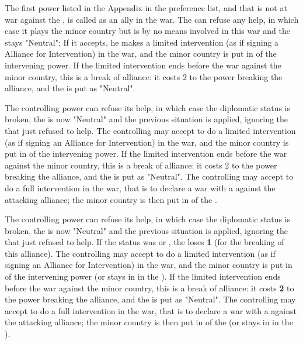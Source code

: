 The first power listed in the Appendix in the preference list, and that is not
at war against the \MIN, is called as an ally in the war.
\bparag The \MAJ can refuse any help, in which case it plays the minor country
but is by no means involved in this war and the \MIN stays "Neutral";
\bparag If it accepts, he makes a limited intervention (as if signing a
Alliance for Intervention) in the war, and the minor country is put in \AM of
the intervening power.
\bparag If the limited intervention ends before the war against the minor
country, this is a break of alliance: it costs 2 \STAB to the power breaking
the alliance, and the \MIN is put as "Neutral".

\bparag The controlling power can refuse its help, in which case the
diplomatic status is broken, the \MIN is now "Neutral" and the previous
situation is applied, ignoring the \MAJ that just refused to help.
\bparag The controlling \MAJ may accept to do a limited intervention (as if
signing an Alliance for Intervention) in the war, and the minor country is put
in \AM of the intervening power.
\bparag If the limited intervention ends before the war against the minor
country, this is a break of alliance: it costs 2 \STAB to the power breaking
the alliance, and the \MIN is put as "Neutral".
\bparag The controlling \MAJ may accept to do a full intervention in the war,
that is to declare a war with a \CB against the attacking alliance; the minor
country is then put in \EG of the \MAJ.

\bparag The controlling power can refuse its help, in which case the
diplomatic status is broken, the \MIN is now "Neutral" and the previous
situation is applied, ignoring the \MAJ that just refused to help.  If the
status was \EG or \dipAT, the \MAJ loses {\bf 1} \STAB (for the breaking of
this alliance).
\bparag The controlling \MAJ may accept to do a limited intervention (as if
signing an Alliance for Intervention) in the war, and the minor country is put
in \AM of the intervening power (or stays in \dipAT in the \ROTW).
\bparag If the limited intervention ends before the war against the minor
country, this is a break of alliance: it costs {\bf 2} \STAB to the power
breaking the alliance, and the \MIN is put as "Neutral".
\bparag The controlling \MAJ may accept to do a full intervention in the war,
that is to declare a war with a \CB against the attacking alliance; the minor
country is then put in \EG of the \MAJ (or stays in \dipAT in the \ROTW).

